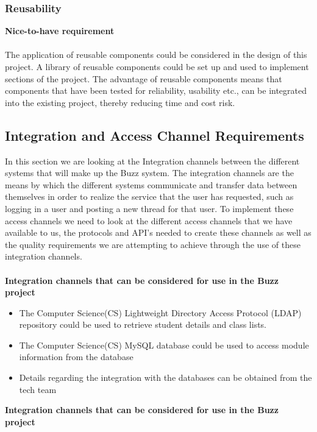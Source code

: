 \documentclass[a4paper]{article}
\begin{document}
\subsubsection{Reusability }
\textbf{Nice-to-have requirement}
\\
\\The application of reusable components could be considered in the design of this project. A library of reusable components could be set up and used to implement sections of the project. The advantage of reusable components means that components that have been tested for reliability, usability etc., can be integrated into the existing project, thereby reducing time and cost risk.

\subsection{Integration and Access Channel Requirements}
In this section we are looking at the Integration channels between the different systems that will make up the Buzz system. The integration channels are the means by which the different systems communicate and transfer data between themselves in order to realize the service that the user has requested, such as logging in a user and posting a new thread for that user. To implement these access channels we need to look at the different access channels that we have available to us, the protocols and API’s needed to create these channels as well as the quality requirements we are attempting to achieve through the use of these integration channels.
\\
\\\textbf{Integration channels that can be considered for use in the Buzz project}
\begin{itemize}
	\item The Computer Science(CS) Lightweight Directory Access Protocol (LDAP) repository could be used to retrieve student details and class lists.
	\item The Computer Science(CS) MySQL database could be used to access module information from the database
	\item Details regarding the integration with the databases can be obtained from the tech team 
\end{itemize}
\textbf{Integration channels that can be considered for use in the Buzz project}
\end{document}
